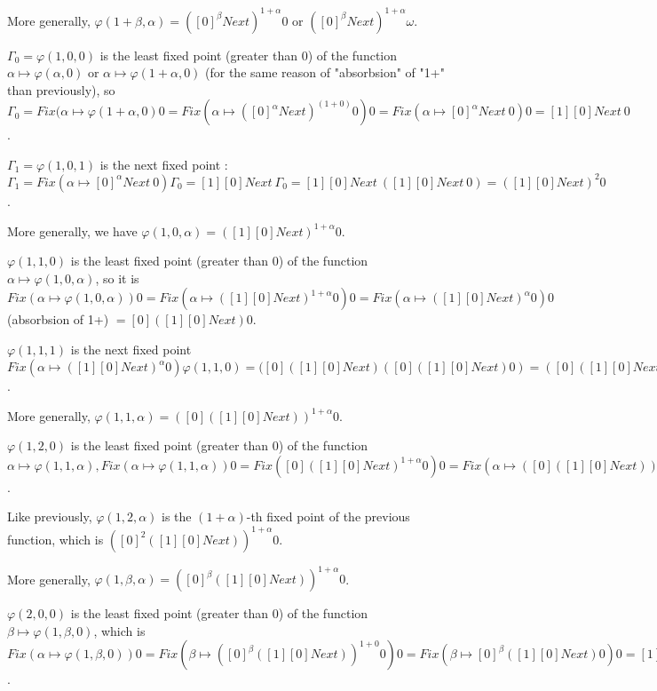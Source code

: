\documentclass[10pt]{article}
\begin{document}
More generally, \( \varphi(1+\beta,\alpha) = ([0]^\beta Next)^{1+\alpha} 0 \) or \( ([0]^\beta Next)^{1+\alpha} \omega \).

\bigskip

\( \Gamma_0 = \varphi(1,0,0) \) is the least fixed point (greater than 0) of the function \( \alpha \mapsto \varphi(\alpha,0) \) or \( \alpha \mapsto \varphi(1+\alpha,0) \) (for the same reason of "absorbsion" of "1+" than previously), so \( \Gamma_0 = Fix (\alpha \mapsto \varphi(1+\alpha,0) 0 = Fix (\alpha \mapsto ([0]^\alpha Next)^(1+0) 0) 0 = Fix (\alpha \mapsto [0]^\alpha Next\ 0) 0 = [1] [0] Next\ 0 \).

\( \Gamma_1 = \varphi(1,0,1) \) is the next fixed point : \( \Gamma_1 = Fix (\alpha \mapsto [0]^\alpha Next\ 0) \Gamma_0 = [1] [0] Next\ \Gamma_0 = [1] [0] Next\ ([1] [0] Next\ 0) = ([1] [0] Next)^2 0 \).

More generally, we have \( \varphi(1,0,\alpha) = ([1] [0] Next)^{1+\alpha} 0 \).

\( \varphi(1,1,0) \) is the least fixed point (greater than 0) of the function \( \alpha \mapsto \varphi(1,0,\alpha) \), so it is \( Fix (\alpha \mapsto \varphi(1,0,\alpha)) 0 = Fix (\alpha \mapsto ([1] [0] Next)^{1+\alpha} 0) 0 = Fix (\alpha \mapsto ([1] [0] Next)^{\alpha} 0) 0 \) (absorbsion of 1+) \( = [0] ([1] [0] Next) 0 \).

\( \varphi(1,1,1) \) is the next fixed point \( Fix (\alpha \mapsto ([1] [0] Next)^{\alpha} 0) \varphi(1,1,0) = ([0] ([1] [0] Next) ([0] ([1] [0] Next) 0) = ([0] ([1] [0] Next))^2 0 \).

More generally, \( \varphi(1,1,\alpha) = ([0] ([1] [0] Next))^{1+\alpha} 0 \).

\( \varphi(1,2,0) \) is the least fixed point (greater than 0) of the function \( \alpha \mapsto \varphi(1,1,\alpha), Fix (\alpha \mapsto \varphi(1,1,\alpha)) 0 = Fix ([0] ([1] [0] Next)^{1+\alpha} 0) 0 = Fix (\alpha \mapsto ([0] ([1] [0] Next))^\alpha 0) 0 = [0] ([0] ([1] [0] Next)) 0 = [0]^2 ([1] [0] Next) 0 \).

Like previously, \( \varphi(1,2,\alpha) \) is the \( (1+\alpha) \)-th fixed point of the previous function, which is \( ([0]^2 ([1] [0] Next))^{1+\alpha} 0 \).

More generally, \( \varphi(1,\beta,\alpha) = ([0]^\beta ([1] [0] Next))^{1+\alpha} 0 \).

\( \varphi(2,0,0) \) is the least fixed point (greater than 0) of the function \( \beta \mapsto \varphi(1,\beta,0) \), which is \( Fix (\alpha \mapsto \varphi(1,\beta,0)) 0 = Fix (\beta \mapsto ([0]^\beta ([1] [0] Next))^{1+0} 0) 0 = Fix (\beta \mapsto [0]^\beta ([1] [0] Next) 0) 0 = [1] [0] ([1] [0] Next) 0 = ([1] [0])^2 Next\ 0 \).
\end{document}
